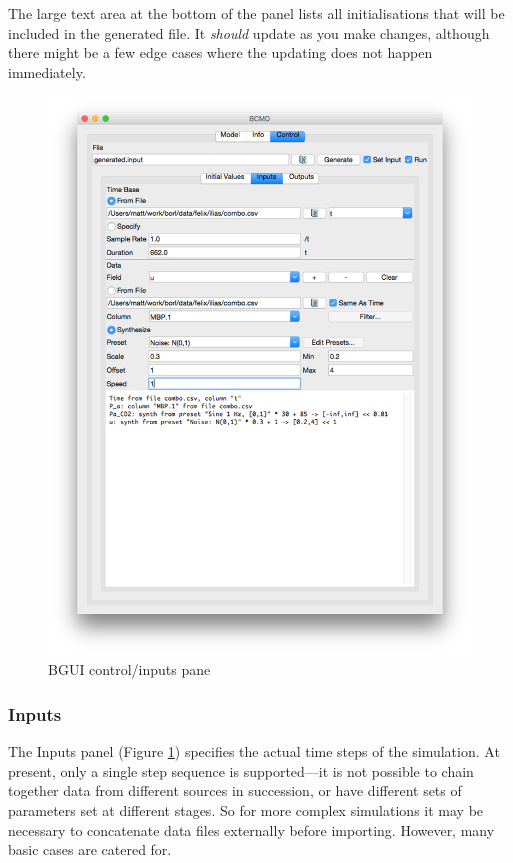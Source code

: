 \documentclass[a4paper,11pt]{article}
\begin{document}
The large text area at the bottom of the panel lists all initialisations that will be included in the generated file. It \textit{should} update as you make changes, although there might be a few edge cases where the updating does not happen immediately.

\begin{figure}[tbph]
\begin{center}
\includegraphics[scale=0.5]{figures/inputs.png}
\caption{BGUI control/inputs pane}
\label{fig:bgui:inputs}
\end{center}
\end{figure}

\subsubsection{Inputs}\label{bgui:inputs}

The Inputs panel (Figure \ref{fig:bgui:inputs}) specifies the actual time steps of the simulation. At present, only a single step sequence is supported---it is not possible to chain together data from different sources in succession, or have different sets of parameters set at different stages. So for more complex simulations it may be necessary to concatenate data files externally before importing. However, many basic cases are catered for.
\end{document}
